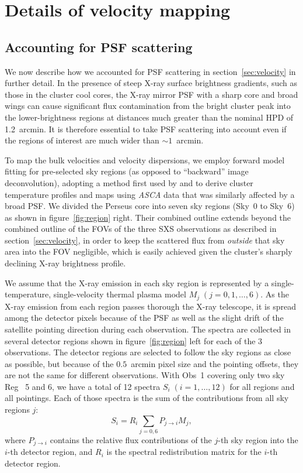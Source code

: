 \section{Details of velocity mapping}
\label{sec:details}

\subsection{Accounting for PSF scattering}
\label{sec:xcm}

We now describe how we accounted for PSF scattering in section~\ref{sec:velocity} in further detail. In the presence of steep X-ray surface brightness gradients, such as those in the cluster cool cores, the X-ray mirror PSF with a sharp core and broad wings \citep{okajima16} can cause significant flux contamination from the bright cluster peak into the lower-brightness regions at distances much greater than the nominal HPD of 1.2~arcmin. It is therefore essential to take PSF scattering into account even if the regions of interest are much wider than $\sim 1$~arcmin.

To map the bulk velocities and velocity dispersions, we employ forward model fitting for pre-selected sky regions (as opposed to ``backward'' image deconvolution), adopting a method first used by \cite{markevitch96a} and \cite{markevitch96b} to derive cluster temperature profiles and maps using {\it ASCA} data that was similarly affected by a broad PSF. We divided the Perseus core into seven sky regions (Sky~0 to Sky~6) as shown in figure~\ref{fig:region} right. Their combined outline extends beyond the combined outline of the FOVs of the three SXS observations as described in section~\ref{sec:velocity}, in order to keep the scattered flux from {\em outside}\/ that sky area into the FOV negligible, which is easily achieved given the cluster's sharply declining X-ray brightness profile.

We assume that the X-ray emission in each sky region is represented by a single-temperature, single-velocity thermal plasma model $M_{j}\;(j=0, 1,\dots, 6)$. As the X-ray emission from each region passes thorough the X-ray telescope, it is spread among the detector pixels because of the PSF as well as the slight drift of the satellite pointing direction during each observation. The spectra are collected in several detector regions shown in figure~\ref{fig:region} left for each of the 3 observations. The detector regions are selected to follow the sky regions as close as possible, but because of the $0.5$~arcmin pixel size and the pointing offsets, they are not the same for different observations. With Obs~1 covering only two sky Reg~ 5 and 6, we have a total of 12 spectra $S_i\;(i=1,\dots,12)$ for all regions and all pointings. Each of those spectra is the sum of the contributions from all sky regions $j$:
\begin{equation}
 S_i = R_i \sum_{j=0,6} P_{j\rightarrow i} M_{j},
\label{eq:modelsum}
\end{equation}
where $P_{j\rightarrow i}$ contains the relative flux contributions of the $j$-th sky region into the $i$-th detector region, and $R_i$\/ is the spectral redistribution matrix for the $i$-th detector region.

